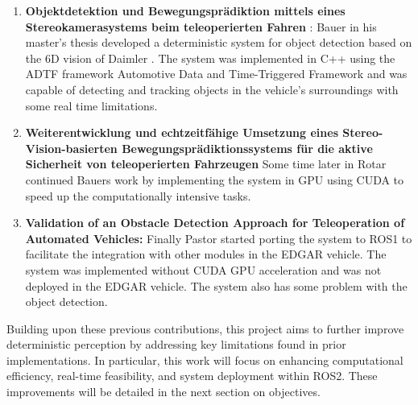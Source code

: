 \begin{enumerate}
  \item \textbf{Objektdetektion und Bewegungsprädiktion mittels eines Stereokamerasystems beim teleoperierten Fahren} \cite{previous_tfm_bauer}: Bauer 
  in his master's thesis developed a deterministic system for object detection based on the 6D vision of Daimler \cite{6d_vision_daimler}. The system 
  was implemented in C++ using the ADTF framework {Automotive Data and Time-Triggered Framework} and was capable of detecting and tracking objects in the vehicle's surroundings 
  with some real time limitations.

  \item \textbf{Weiterentwicklung und echtzeitfähige Umsetzung eines Stereo-Vision-basierten Bewegungsprädiktionssystems für die aktive Sicherheit von teleoperierten Fahrzeugen}
  Some time later in \cite{previous_tfm_gpu_implementation} Rotar continued Bauers work by implementing the system in GPU using CUDA to speed up the computationally intensive tasks.

  \item \textbf{Validation of an Obstacle Detection Approach for Teleoperation of Automated Vehicles:} Finally Pastor \cite{previous_tfm_pastor} started porting the system to ROS1
   to facilitate the integration with other modules in the EDGAR vehicle. The system was implemented without CUDA GPU acceleration
   and was not deployed in the EDGAR vehicle. The system also has some problem with the object detection.
\end{enumerate}

Building upon these previous contributions, this project aims to further improve deterministic perception by 
addressing key limitations found in prior implementations. 
In particular, this work will focus on enhancing computational efficiency, real-time feasibility, 
and system deployment within ROS2. These improvements will be detailed in the next section on objectives.